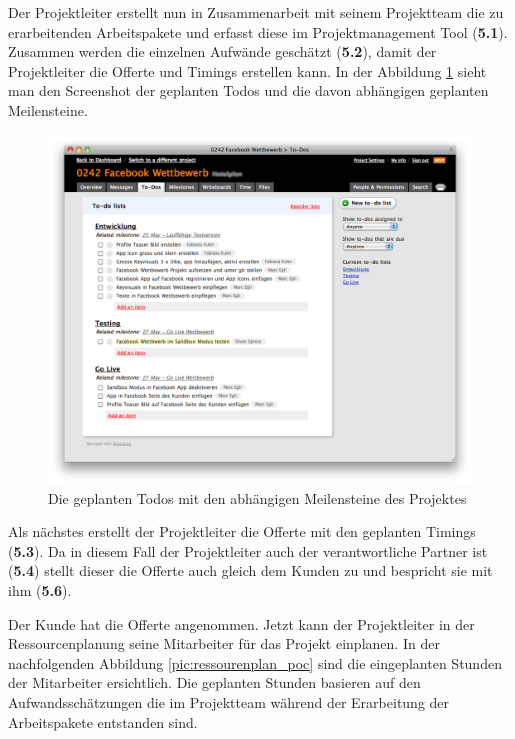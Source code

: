 Der Projektleiter erstellt nun in Zusammenarbeit mit seinem Projektteam die
zu erarbeitenden Arbeitspakete und erfasst diese im Projektmanagement Tool (\textbf{5.1}).
Zusammen werden die einzelnen Aufwände geschätzt (\textbf{5.2}), damit der 
Projektleiter die Offerte und Timings erstellen kann. In der
Abbildung \ref{pic:todos_poc} sieht man den Screenshot der geplanten Todos und die davon
abhängigen geplanten Meilensteine.

\begin{figure}[htbp]
\begin{center}
\includegraphics[width=1.0\textwidth,angle=0]{./bilder/proof_of_concept/todos_poc.png}
\caption[Die geplanten Todos mit den abhängigen Meilensteine des Projektes]{Die geplanten Todos 
    mit den abhängigen Meilensteine des Projektes\footnotemark}
\label{pic:todos_poc}
\end{center}
\end{figure}

Als nächstes erstellt der Projektleiter die Offerte mit den geplanten Timings
(\textbf{5.3}). Da in diesem Fall der Projektleiter auch der verantwortliche
Partner ist (\textbf{5.4}) stellt dieser die Offerte auch gleich dem Kunden zu und bespricht
sie mit ihm (\textbf{5.6}).

Der Kunde hat die Offerte angenommen. Jetzt kann der Projektleiter in der 
Ressourcenplanung seine Mitarbeiter für das Projekt einplanen. In der nachfolgenden
Abbildung \ref{pic:ressourenplan_poc} sind die eingeplanten Stunden der Mitarbeiter
ersichtlich. Die geplanten Stunden basieren auf den Aufwandsschätzungen die im
Projektteam während der Erarbeitung der Arbeitspakete entstanden sind.

